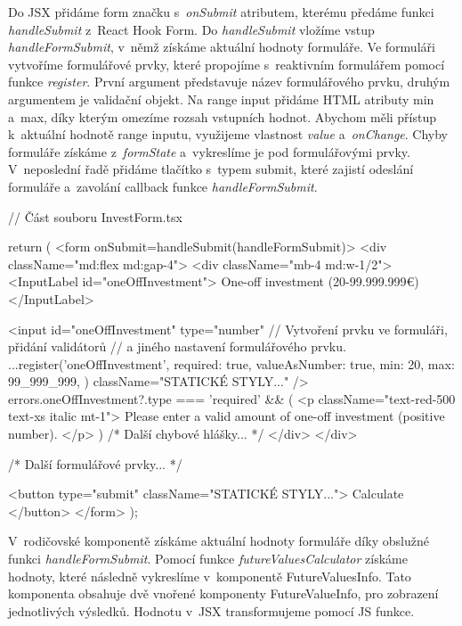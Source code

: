 Do JSX přidáme form značku s~\emph{onSubmit} atributem, kterému předáme funkci \emph{handleSubmit} z~React Hook Form. Do \emph{handleSubmit} vložíme vstup \emph{handleFormSubmit}, v~němž získáme aktuální hodnoty formuláře. 
Ve formuláři vytvoříme formulářové prvky, které propojíme s~reaktivním formulářem pomocí funkce \emph{register}. První argument představuje název formulářového prvku, druhým argumentem je validační objekt. 
Na range input přidáme HTML atributy min a~max, díky kterým omezíme rozsah vstupních hodnot. Abychom měli přístup k~aktuální hodnotě range inputu, využijeme vlastnost \emph{value} a~\emph{onChange}. 
Chyby formuláře získáme z~\emph{formState} a~vykreslíme je pod formulářovými prvky. V~neposlední řadě přidáme tlačítko s~typem submit, které zajistí odeslání formuláře a~zavolání callback funkce \emph{handleFormSubmit}.

\begin{prog}
// Část souboru InvestForm.tsx

return (
  <form onSubmit={handleSubmit(handleFormSubmit)}>
    <div className="md:flex md:gap-4">
      <div className="mb-4 md:w-1/2">
        <InputLabel id="oneOffInvestment">
          One-off investment (20-99.999.999€)
        </InputLabel>

        <input
          id="oneOffInvestment"
          type="number"
          // Vytvoření prvku ve formuláři, přidání validátorů 
          // a jiného nastavení formulářového prvku.
          {...register('oneOffInvestment', {
            required: true,
            valueAsNumber: true,
            min: 20,
            max: 99_999_999,
          })}
          className="STATICKÉ STYLY..."
        />
        {errors.oneOffInvestment?.type === 'required' && (
          <p className="text-red-500 text-xs italic mt-1">
            Please enter a valid amount of one-off investment (positive number).
          </p>
        )}
        {/* Další chybové hlášky... */}
      </div>
    </div>

    {/* Další formulářové prvky... */}

    <button type="submit" className="STATICKÉ STYLY...">
      Calculate
    </button>
  </form>
);
\end{prog}

V~rodičovské komponentě získáme aktuální hodnoty formuláře díky obslužné funkci \emph{handleFormSubmit}. Pomocí funkce \emph{futureValuesCalculator} získáme hodnoty, které následně vykreslíme v~komponentě FutureValuesInfo. 
Tato komponenta obsahuje dvě vnořené komponenty FutureValueInfo, pro zobrazení jednotlivých výsledků. Hodnotu v~JSX transformujeme pomocí JS funkce.

